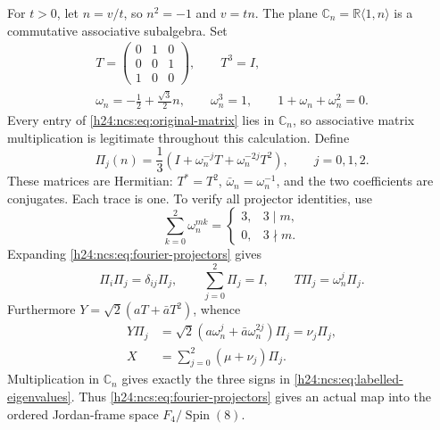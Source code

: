 For $t>0$, let $n=v/t$, so $n^2=-1$ and $v=tn$.
The plane $\mathbb C_n=\mathbb R\langle1,n\rangle$ is a
commutative associative subalgebra. Set
\begin{equation}
 \begin{gathered}
 T=\begin{pmatrix}0&1&0\\0&0&1\\1&0&0\end{pmatrix},
 \qquad T^3=I,\\
 \omega_n=-\frac12+\frac{\sqrt3}{2}n,\qquad
 \omega_n^3=1,\qquad1+\omega_n+\omega_n^2=0.
 \end{gathered}
 \label{h24:ncs:eq:cyclic-matrix}\tag{NCS10}
\end{equation}
Every entry of \eqref{h24:ncs:eq:original-matrix} lies in
$\mathbb C_n$, so associative matrix multiplication is legitimate
throughout this calculation. Define
\begin{equation}
 \Pi_j(n)=\frac13\left(I+\omega_n^{-j}T
                               +\omega_n^{-2j}T^2\right),
 \qquad j=0,1,2.
 \label{h24:ncs:eq:fourier-projectors}\tag{NCS11}
\end{equation}
These matrices are Hermitian: $T^*=T^2$,
$\bar\omega_n=\omega_n^{-1}$, and the two coefficients are
conjugates. Each trace is one. To verify all projector identities,
use
\[
 \sum_{k=0}^2\omega_n^{mk}=
 \begin{cases}3,&3\mid m,\\0,&3\nmid m.\end{cases}
\]
Expanding \eqref{h24:ncs:eq:fourier-projectors} gives
\begin{equation}
 \Pi_i\Pi_j=\delta_{ij}\Pi_j,\qquad
 \sum_{j=0}^2\Pi_j=I,\qquad T\Pi_j=\omega_n^j\Pi_j.
 \label{h24:ncs:eq:projector-identities}\tag{NCS12}
\end{equation}
Furthermore $Y=\sqrt2(aT+\bar aT^2)$, whence
\begin{equation}
 \begin{aligned}
 Y\Pi_j&=\sqrt2(a\omega_n^j+\bar a\omega_n^{2j})\Pi_j
            =\nu_j\Pi_j,\\
 X&=\sum_{j=0}^2(\mu+\nu_j)\Pi_j.
 \end{aligned}
 \label{h24:ncs:eq:spectral-decomposition}\tag{NCS13}
\end{equation}
Multiplication in $\mathbb C_n$ gives exactly the three signs in
\eqref{h24:ncs:eq:labelled-eigenvalues}. Thus
\eqref{h24:ncs:eq:fourier-projectors} gives an actual map into the
ordered Jordan-frame space $F_4/\operatorname{Spin}(8)$.

